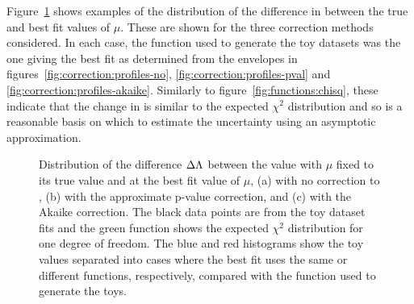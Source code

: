 Figure~\ref{fig:correction:chisq} shows examples of
the distribution of the difference
in \nll between the true and best fit values of $\mu$. These are shown for the
three correction methods considered. In each case, the function used to generate
the toy datasets was the one giving the best fit as determined from the 
envelopes in figures~\ref{fig:correction:profiles-no}, 
\ref{fig:correction:profiles-pval} and
\ref{fig:correction:profiles-akaike}.
Similarly to figure~\ref{fig:functions:chisq}, these indicate that the
change in \nll is similar to the expected $\chi^2$ distribution and so
is a reasonable basis on which to estimate the uncertainty using an
asymptotic approximation.
%
\begin{figure}[tbp]
\centering
\caption{Distribution of the difference $\Delta\Lambda$ between the \nll value with $\mu$ fixed to its true value and \nll at the best fit value
of $\mu$, (a) with no correction to \nll, (b) with the approximate p-value
correction, and (c) with the Akaike correction.
The black data points are from the toy dataset fits and the green function
shows the expected $\chi^2$ distribution for one degree of freedom. The blue and red histograms show the toy values separated into
cases where the best fit uses the same or different functions, respectively, compared with the function used to generate the toys.}
\label{fig:correction:chisq}
\end{figure}


